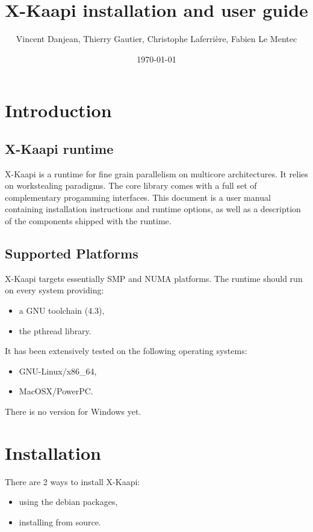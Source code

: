 \documentclass{article}
\newcommand{\kaapi}{\textsc{X}-Kaapi\xspace}
\begin{document}
\title{\kaapi installation and user guide}
\author{Vincent Danjean, Thierry Gautier, Christophe Laferrière, Fabien Le Mentec}
\date{\today}
\maketitle
\tableofcontents
\newpage

\section{Introduction}

\subsection{\kaapi runtime}
\kaapi is a runtime for fine grain parallelism on multicore architectures.
It relies on workstealing paradigms.
The core library comes with a full set of complementary progamming interfaces.
This document is a user manual containing installation instructions and runtime
options, as well as a description of the components shipped with the runtime.

\subsection{Supported Platforms}
\kaapi targets essentially SMP and NUMA platforms. The runtime should run
on every system providing:
\begin{itemize}
\item a GNU toolchain (4.3),
\item the pthread library.
\end{itemize}
It has been extensively tested on the following operating systems:
\begin{itemize}
\item GNU-Linux/x86\_64,
\item MacOSX/PowerPC.
\end{itemize}
There is no version for Windows yet.

\section{Installation}

There are 2 ways to install \kaapi:
\begin{itemize}
\item using the debian packages,
\item installing from source.
\end{itemize}
\end{document}
